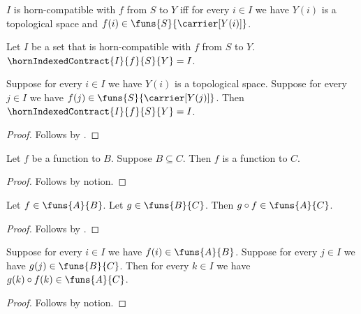 

\begin{abbreviation}\label{horn_indexed_requirements}
    $I$ is horn-compatible with $f$ from $S$ to $Y$ iff
        for every $i\in I$ we have $Y(i)$ is a topological space and
            $f(i)\in\funs{S}{\carrier[Y(i)]}$.
\end{abbreviation}

\begin{definition}\label{horn_indexed_contract}
    Let $I$ be a set that is horn-compatible with $f$ from $S$ to $Y$.
    $\hornIndexedContract{I}{f}{S}{Y}=I$.
\end{definition}

\begin{proposition}\label{horn_indexed_contract_consumer}
    Suppose for every $i\in I$ we have $Y(i)$ is a topological space.
    Suppose for every $j\in I$ we have $f(j)\in\funs{S}{\carrier[Y(j)]}$.
    Then $\hornIndexedContract{I}{f}{S}{Y}=I$.
\end{proposition}
\begin{proof}
    Follows by .
\end{proof}

\begin{proposition}\label{horn_codomain_weakening}
    Let $f$ be a function to $B$.
    Suppose $B\subseteq C$.
    Then $f$ is a function to $C$.
\end{proposition}
\begin{proof}
    Follows by notion.
\end{proof}

\begin{classification}\label{horn_composition_type}
    Let $f\in\funs{A}{B}$.
    Let $g\in\funs{B}{C}$.
    Then $g\circ f\in\funs{A}{C}$.
\end{classification}
\begin{proof}
    Follows by .
\end{proof}

\begin{proposition}\label{horn_pointwise_composition}
    Suppose for every $i\in I$ we have $f(i)\in\funs{A}{B}$.
    Suppose for every $j\in I$ we have $g(j)\in\funs{B}{C}$.
    Then for every $k\in I$ we have $g(k)\circ f(k)\in\funs{A}{C}$.
\end{proposition}
\begin{proof}
    Follows by notion.
\end{proof}
